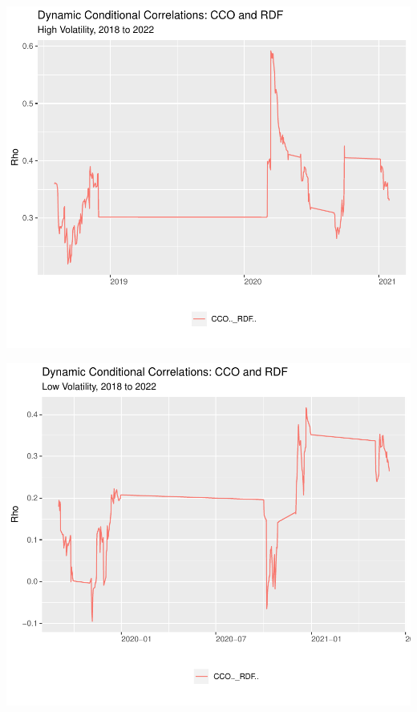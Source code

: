 \documentclass[11pt,preprint, authoryear]{elsarticle}
\let\origfigure\figure
\let\endorigfigure\endfigure
\renewenvironment{figure}[1][2] {
    \expandafter\origfigure\expandafter[H]
} {
    \endorigfigure
}
\numberwithin{equation}{section}
\numberwithin{figure}{section}
\numberwithin{table}{section}
\begin{document}
\begin{figure}
\centering
\includegraphics{Fin_Metrics_Project_files/figure-latex/unnamed-chunk-19-1.pdf}
\caption{Dynamic Conditional Correlations Graph}
\end{figure}

\begin{figure}
\centering
\includegraphics{Fin_Metrics_Project_files/figure-latex/unnamed-chunk-21-1.pdf}
\caption{Dynamic Conditional Correlations Graph}
\end{figure}
\end{document}
